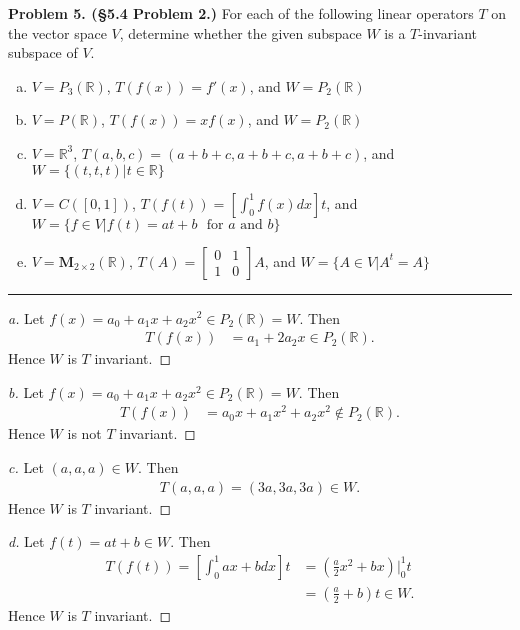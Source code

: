 \documentclass[leqno]{article}
\theoremstyle{nonumberplain}
\newtheorem{proof}{Proof}
\newcommand{\R}{\mathbb{R}}
\begin{document}
\noindent\textbf{Problem 5. (\S 5.4 Problem 2.)} For each of the following linear operators $T$ on the vector space $V$, determine whether the given subspace $W$ is a $T$-invariant subspace of $V$.
\begin{enumerate}[(a)]
\item $V=P_3(\mathbb{R})$, $T(f(x))=f'(x)$, and $W=P_2(\mathbb{R})$
\item $V=P(\mathbb{R})$, $T(f(x))=xf(x)$, and $W=P_2(\mathbb{R})$
\item $V=\mathbb{R}^3$, $T(a,b,c)=(a+b+c,a+b+c,a+b+c)$, and $W=\{(t,t,t)\vert t\in \mathbb{R}\}$
\item $V=C([0,1])$, $T(f(t))=\left[ \int_0^1 f(x)dx \right]t$, and $W=\{f\in V\vert f(t)=at+b \textrm{~ for $a$ and $b$}\}$
\item $V=\mathbf{M}_{2\times 2}(\mathbb{R})$, $T(A)=\begin{bmatrix}
0 & 1\\
1 & 0
\end{bmatrix}A$, and $W=\{A\in V\vert A^t=A\}$
\end{enumerate}

\noindent\rule[0.5ex]{\linewidth}{1pt}

\begin{proof}[a]
Let $f(x)=a_0+a_1 x+a_2 x^2 \in P_2(\R)=W$. Then
\begin{align*}
T(f(x))&=a_1+2a_2x\in P_2(\R).
\end{align*}
Hence $W$ is $T$ invariant.
\end{proof}

\begin{proof}[b]
Let $f(x)=a_0+a_1x+a_2x^2 \in P_2(\R)=W$. Then
\begin{align*}
T(f(x))&=a_0x+a_1x^2+a_2x^2\notin P_2(\R).
\end{align*}
Hence $W$ is not $T$ invariant.
\end{proof}

\begin{proof}[c]
Let $(a,a,a)\in W$. Then
\begin{align*}
T(a,a,a)=(3a,3a,3a)\in W.
\end{align*}
Hence $W$ is $T$ invariant.
\end{proof}

\begin{proof}[d]
Let $f(t)=at+b\in W$. Then
\begin{align*}
T(f(t))=\left[ \int_0^1 ax+b dx \right] t&=\left(\frac{a}{2}x^2+bx\right)\vert_0^1 t\\
&= \left(\frac{a}{2}+b\right)t\in W.
\end{align*}
Hence $W$ is $T$ invariant.
\end{proof}
\end{document}

